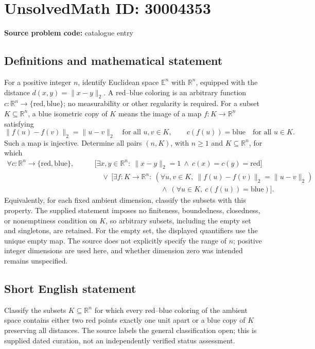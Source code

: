 \documentclass[11pt]{article}
\newcommand{\R}{\mathbb{R}}
\begin{document}
\section*{UnsolvedMath ID: 30004353}
\textbf{Source problem code:} catalogue entry
\subsection{Definitions and mathematical statement}
For a positive integer \(n\), identify Euclidean space \(\mathbb E^n\) with \(\R^n\), equipped with the distance \(d(x,y)=\|x-y\|_2\). A red--blue coloring is an arbitrary function \(c:\R^n\to\{\mathrm{red},\mathrm{blue}\}\); no measurability or other regularity is required. For a subset \(K\subseteq\R^n\), a blue isometric copy of \(K\) means the image of a map \(f:K\to\R^n\) satisfying
\[
\|f(u)-f(v)\|_2=\|u-v\|_2\quad\text{for all }u,v\in K,
\qquad c(f(u))=\mathrm{blue}\quad\text{for all }u\in K.
\]
Such a map is injective. Determine all pairs \((n,K)\), with \(n\geq 1\) and \(K\subseteq\R^n\), for which
\[
\begin{aligned}
\forall c:\R^n\to\{\mathrm{red},\mathrm{blue}\},\qquad
&\bigl[\exists x,y\in\R^n:\ \|x-y\|_2=1
\ \land\ c(x)=c(y)=\mathrm{red}\bigr]\\
&\quad\lor\ \bigl[\exists f:K\to\R^n:\
(\forall u,v\in K,\ \|f(u)-f(v)\|_2=\|u-v\|_2)\\
&\hspace{110pt}\land\ (\forall u\in K,\ c(f(u))=\mathrm{blue})\bigr].
\end{aligned}
\]
Equivalently, for each fixed ambient dimension, classify the subsets with this property. The supplied statement imposes no finiteness, boundedness, closedness, or nonemptiness condition on \(K\), so arbitrary subsets, including the empty set and singletons, are retained. For the empty set, the displayed quantifiers use the unique empty map. The source does not explicitly specify the range of \(n\); positive integer dimensions are used here, and whether dimension zero was intended remains unspecified.
\subsection{Short English statement}
Classify the subsets \(K\subseteq\R^n\) for which every red--blue coloring of the ambient space contains either two red points exactly one unit apart or a blue copy of \(K\) preserving all distances. The source labels the general classification open; this is supplied dated curation, not an independently verified status assessment.
\end{document}
